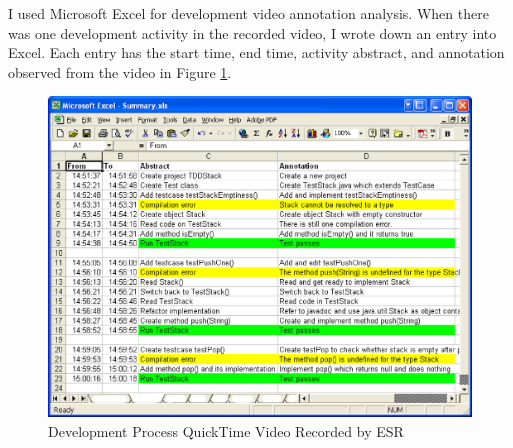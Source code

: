 I used Microsoft Excel for development video annotation analysis. When
there was one development activity in the recorded video, I wrote down
an entry into Excel. Each entry has the start time, end time, activity
abstract, and annotation observed from the video in Figure
\ref{fig:EsrVideoScript}.
\begin{figure}[htbp]
  \centering
  \includegraphics[width=1.0\textwidth]{figs/ESR-VideoScript}
  \caption{Development Process QuickTime Video Recorded by ESR}\label{fig:EsrVideoScript}
\end{figure}

